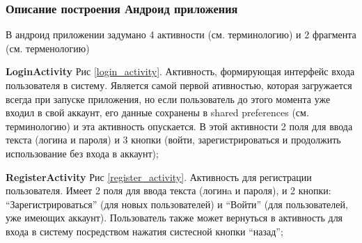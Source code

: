 \subsubsection{Описание построения Андроид приложения}
В андроид приложении задумано 4 активности (см. терминологию) и 2 фрагмента (см. терменологию)\\
\begin{my_enumerate}
    \item \textbf{LoginActivity} Рис \ref{login_activity}. Активность,
        формирующая интерфейс входа пользователя в систему. Является самой
        первой ативностью, которая загружается всегда при запуске приложения,
        но если пользователь до этого момента уже входил в свой аккаунт, его
        данные сохранены в shared preferences (см. терминологию) и эта
        активность опускается. В этой активности 2 поля для ввода текста
        (логина и пароля) и 3 кнопки (войти, зарегистрироваться и продолжить
        использование без входа в аккаунт);
    \item \textbf{RegisterActivity} Рис \ref{register_activity}.  Активность
        для регистрации пользователя.  Имеет 2 поля для ввода текста (логинa и
        пароля), и 2 кнопки: ``Зарегистрироваться'' (для новых пользователей) и
        ``Войти'' (для пользователей, уже имеющих аккаунт). Пользователь также
        может вернуться в активность для входа в систему посредством нажатия
        систесной кнопки ``назад'';
        \begin{figure}[h!]
            \centering

\end{figure}
\end{my_enumerate}
